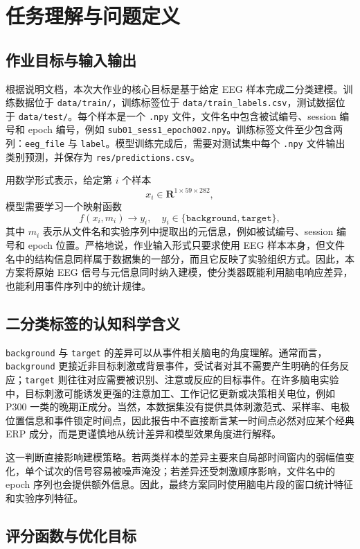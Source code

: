 \chapter{任务理解与问题定义}

\section{作业目标与输入输出}

根据说明文档，本次大作业的核心目标是基于给定 EEG 样本完成二分类建模。训练数据位于 \texttt{data/train/}，训练标签位于 \texttt{data/train\_labels.csv}，测试数据位于 \texttt{data/test/}。每个样本是一个 \texttt{.npy} 文件，文件名中包含被试编号、session 编号和 epoch 编号，例如 \texttt{sub01\_sess1\_epoch002.npy}。训练标签文件至少包含两列：\texttt{eeg\_file} 与 \texttt{label}。模型训练完成后，需要对测试集中每个 \texttt{.npy} 文件输出类别预测，并保存为 \texttt{res/predictions.csv}。

用数学形式表示，给定第 $i$ 个样本
\[
x_i \in \mathbf{R}^{1\times 59\times 282},
\]
模型需要学习一个映射函数
\[
f(x_i, m_i)\rightarrow y_i,\quad y_i\in\{\texttt{background},\texttt{target}\},
\]
其中 $m_i$ 表示从文件名和实验序列中提取出的元信息，例如被试编号、session 编号和 epoch 位置。严格地说，作业输入形式只要求使用 EEG 样本本身，但文件名中的结构信息同样属于数据集的一部分，而且它反映了实验组织方式。因此，本方案将原始 EEG 信号与元信息同时纳入建模，使分类器既能利用脑电响应差异，也能利用事件序列中的统计规律。

\section{二分类标签的认知科学含义}

\texttt{background} 与 \texttt{target} 的差异可以从事件相关脑电的角度理解。通常而言，\texttt{background} 更接近非目标刺激或背景事件，受试者对其不需要产生明确的任务反应；\texttt{target} 则往往对应需要被识别、注意或反应的目标事件。在许多脑电实验中，目标刺激可能诱发更强的注意加工、工作记忆更新或决策相关电位，例如 P300 一类的晚期正成分。当然，本数据集没有提供具体刺激范式、采样率、电极位置信息和事件锁定时间点，因此报告中不直接断言某一时间点必然对应某个经典 ERP 成分，而是更谨慎地从统计差异和模型效果角度进行解释。

这一判断直接影响建模策略。若两类样本的差异主要来自局部时间窗内的弱幅值变化，单个试次的信号容易被噪声淹没；若差异还受刺激顺序影响，文件名中的 epoch 序列也会提供额外信息。因此，最终方案同时使用脑电片段的窗口统计特征和实验序列特征。

\section{评分函数与优化目标}

